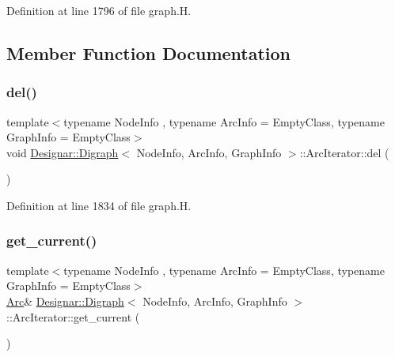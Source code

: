 Definition at line 1796 of file graph.\+H.



\subsection{Member Function Documentation}
\mbox{\label{class_designar_1_1_digraph_1_1_arc_iterator_aa4f42b888685025c5c3f2e730df4eb36}} 
\subsubsection{\texorpdfstring{del()}{del()}}
{\footnotesize\ttfamily template$<$typename Node\+Info , typename Arc\+Info  = Empty\+Class, typename Graph\+Info  = Empty\+Class$>$ \\
void \hyperlink{class_designar_1_1_digraph}{Designar\+::\+Digraph}$<$ Node\+Info, Arc\+Info, Graph\+Info $>$\+::Arc\+Iterator\+::del (\begin{DoxyParamCaption}{ }\end{DoxyParamCaption})\hspace{0.3cm}{\ttfamily [inline]}}



Definition at line 1834 of file graph.\+H.

\mbox{\label{class_designar_1_1_digraph_1_1_arc_iterator_af7734cd84a4dd523f276064833abaa85}} 
\subsubsection{\texorpdfstring{get\+\_\+current()}{get\_current()}\hspace{0.1cm}{\footnotesize\ttfamily [1/2]}}
{\footnotesize\ttfamily template$<$typename Node\+Info , typename Arc\+Info  = Empty\+Class, typename Graph\+Info  = Empty\+Class$>$ \\
\hyperlink{class_designar_1_1_digraph_a0ceb278671f2a535c00fddccdeafd69f}{Arc}\& \hyperlink{class_designar_1_1_digraph}{Designar\+::\+Digraph}$<$ Node\+Info, Arc\+Info, Graph\+Info $>$\+::Arc\+Iterator\+::get\+\_\+current (\begin{DoxyParamCaption}{ }\end{DoxyParamCaption})\hspace{0.3cm}{\ttfamily [inline]}}



